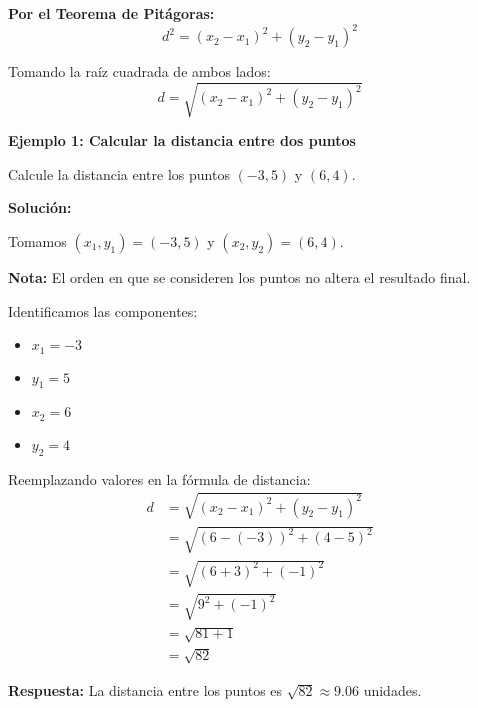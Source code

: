 \textbf{Por el Teorema de Pitágoras:}
$$d^2 = (x_2 - x_1)^2 + (y_2 - y_1)^2$$

Tomando la raíz cuadrada de ambos lados:
$$d = \sqrt{(x_2 - x_1)^2 + (y_2 - y_1)^2}$$

\begin{example}
\textbf{Ejemplo 1: Calcular la distancia entre dos puntos}

Calcule la distancia entre los puntos $(-3, 5)$ y $(6, 4)$.

\textbf{Solución:}

Tomamos $(x_1, y_1) = (-3, 5)$ y $(x_2, y_2) = (6, 4)$.

\textbf{Nota:} El orden en que se consideren los puntos no altera el resultado final.

Identificamos las componentes:
\begin{itemize}
    \item $x_1 = -3$
    \item $y_1 = 5$
    \item $x_2 = 6$
    \item $y_2 = 4$
\end{itemize}

Reemplazando valores en la fórmula de distancia:
\begin{align*}
d &= \sqrt{(x_2 - x_1)^2 + (y_2 - y_1)^2} \\
  &= \sqrt{(6 - (-3))^2 + (4 - 5)^2} \\
  &= \sqrt{(6 + 3)^2 + (-1)^2} \\
  &= \sqrt{9^2 + (-1)^2} \\
  &= \sqrt{81 + 1} \\
  &= \sqrt{82}
\end{align*}

\textbf{Respuesta:} La distancia entre los puntos es $\sqrt{82} \approx 9.06$ unidades.
\end{example}


